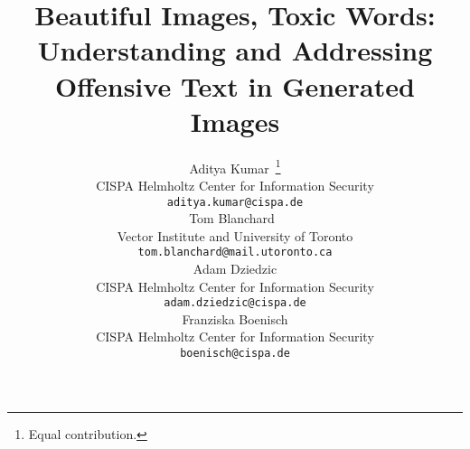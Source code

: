 \documentclass{article}
\title{{Beautiful Images, Toxic Words: Understanding and Addressing Offensive Text in Generated Images}}
\author{%
Aditya Kumar~\thanks{Equal contribution.} \\
CISPA Helmholtz Center for Information Security \\
\texttt{aditya.kumar@cispa.de} \\
\And
Tom Blanchard~\footnotemark[1] \\
Vector Institute and University of Toronto \\
\texttt{tom.blanchard@mail.utoronto.ca} \\
\AND
Adam Dziedzic \\
CISPA Helmholtz Center for Information Security \\
\texttt{adam.dziedzic@cispa.de} \\
\And
Franziska Boenisch \\
CISPA Helmholtz Center for Information Security \\
\texttt{boenisch@cispa.de} \\
}
\begin{document}
\iclrfinalcopy %
\maketitle












\newpage
\appendix
\onecolumn

\end{document}

